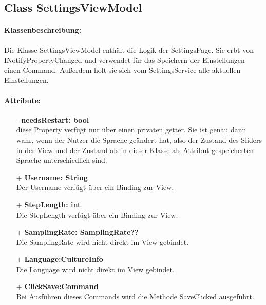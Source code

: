 \documentclass[a4paper,12pt]{article}
\begin{document}
\subsection{Class SettingsViewModel}

\paragraph{Klassenbeschreibung:}
Die Klasse SettingsViewModel enthält die Logik der SettingsPage. Sie erbt von INotifyPropertyChanged und verwendet für das Speichern der Einstellungen einen Command. Außerdem holt sie sich vom SettingsService alle aktuellen Einstellungen.
\paragraph{Attribute:}
\begin{itemize}
	\item[-] \textbf{needsRestart: bool}\\ diese Property verfügt nur über einen privaten getter. Sie ist genau dann wahr, wenn der Nutzer die Sprache geändert hat, also der Zustand des Sliders in der View und der Zustand als in dieser Klasse als Attribut gespeicherten Sprache unterschiedlich sind.
	\item[+] \textbf{Username: String}\\Der Username verfügt über ein Binding zur View.
	\item[+] \textbf{StepLength: int}\\Die StepLength verfügt über ein Binding zur View. 
	\item[+] \textbf{SamplingRate: SamplingRate??}\\Die SamplingRate wird nicht direkt im View gebindet.
	\item[+] \textbf{Language:CultureInfo}\\Die Language wird nicht direkt im View gebindet. 
	\item[+] \textbf{ClickSave:Command}\\Bei Ausführen dieses Commands wird die Methode SaveClicked ausgeführt. 
\end{itemize}
\end{document}
